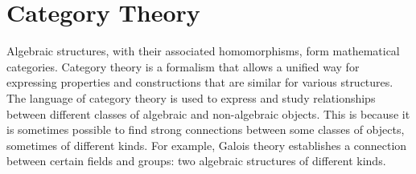 \section{Category Theory}

Algebraic structures, with their associated homomorphisms, form mathematical categories. Category theory is a formalism that allows a unified way for expressing properties and constructions that are similar for various structures. \\

The language of category theory is used to express and study relationships between different classes of algebraic and non-algebraic objects. This is because it is sometimes possible to find strong connections between some classes of objects, sometimes of different kinds. For example, Galois theory establishes a connection between certain fields and groups: two algebraic structures of different kinds.\\